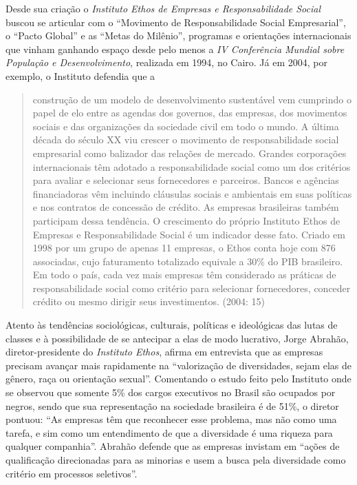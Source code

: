 Desde sua criação o \emph{Instituto Ethos de Empresas e Responsabilidade
Social} buscou se articular com o ``Movimento de Responsabilidade Social
Empresarial'', o ``Pacto Global'' e as ``Metas do Milênio'', programas e
orientações internacionais que vinham ganhando espaço desde pelo menos a
\emph{IV Conferência Mundial sobre População e Desenvolvimento},
realizada em 1994, no Cairo. Já em 2004, por exemplo, o Instituto
defendia que a

\begin{quote}
construção de um modelo de desenvolvimento sustentável vem cumprindo o
papel de elo entre as agendas dos governos, das empresas, dos movimentos
sociais e das organizações da sociedade civil em todo o mundo. A última
década do século XX viu crescer o movimento de responsabilidade social
empresarial como balizador das relações de mercado. Grandes corporações
internacionais têm adotado a responsabilidade social como um dos
critérios para avaliar e selecionar seus fornecedores e parceiros.
Bancos e agências financiadoras vêm incluindo cláusulas sociais e
ambientais em suas políticas e nos contratos de concessão de crédito. As
empresas brasileiras também participam dessa tendência. O crescimento do
próprio Instituto Ethos de Empresas e Responsabilidade Social é um
indicador desse fato. Criado em 1998 por um grupo de apenas 11 empresas,
o Ethos conta hoje com 876 associadas, cujo faturamento totalizado
equivale a 30\% do PIB brasileiro. Em todo o país, cada vez mais
empresas têm considerado as práticas de responsabilidade social como
critério para selecionar fornecedores, conceder crédito ou mesmo dirigir
seus investimentos. (2004: 15)
\end{quote}

Atento às tendências sociológicas, culturais, políticas e ideológicas
das lutas de classes e à possibilidade de se antecipar a elas de modo
lucrativo, Jorge Abrahão, diretor-presidente do \emph{Instituto Ethos},
afirma em entrevista que as empresas precisam avançar mais rapidamente
na ``valorização de diversidades, sejam elas de gênero, raça ou
orientação sexual''. Comentando o estudo feito pelo Instituto onde se
observou que somente 5\% dos cargos executivos no Brasil são ocupados
por negros, sendo que sua representação na sociedade brasileira é de
51\%, o diretor pontuou: ``As empresas têm que reconhecer esse problema,
mas não como uma tarefa, e sim como um entendimento de que a diversidade
é uma riqueza para qualquer companhia''. Abrahão defende que as empresas
invistam em ``ações de qualificação direcionadas para as minorias e usem
a busca pela diversidade como critério em processos seletivos''.

